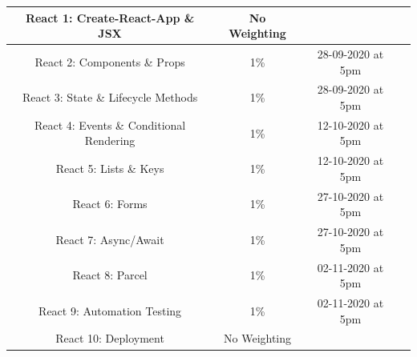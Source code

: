 \documentclass{article}
\begin{document}
\begin{tabular}{|c|c|c|c|}
	\small React 1: Create-React-App  \& JSX                          & \small No Weighting &  \\ \hline
	\small React 2:  Components \& Props                                        & \small 1\%          & \small 28-09-2020 at 5pm \\ \hline
	\small React 3: State \& Lifecycle Methods                                       & \small 1\%          & \small 28-09-2020 at 5pm \\ \hline
	\small React 4: Events \& Conditional Rendering                      & \small 1\%          & \small 12-10-2020 at 5pm \\ \hline
	\small React 5:   Lists \& Keys                                     & \small 1\%          & \small 12-10-2020 at 5pm \\ \hline
	\small React 6: Forms                          & \small 1\%          & \small 27-10-2020 at 5pm \\ \hline
	\small React 7: Async/Await                            & \small 1\%          & \small 27-10-2020 at 5pm \\ \hline
	\small React 8: Parcel                       & \small 1\%          & \small 02-11-2020 at 5pm \\ \hline
	\small React 9: Automation Testing                                 & \small 1\%          & \small 02-11-2020 at 5pm \\ \hline
	\small React 10: Deployment                                 & \small No Weighting         & \small  \\ \hline
\end{tabular}
\end{document}
